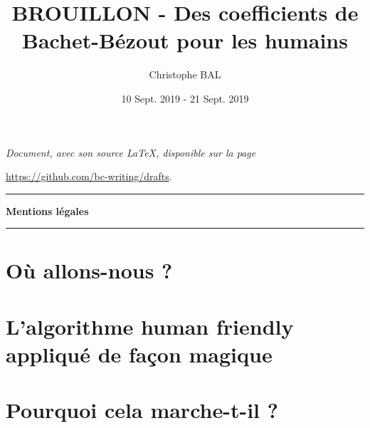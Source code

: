 \documentclass{amsart}
\begin{document}
\title{BROUILLON - Des coefficients de Bachet-Bézout pour les humains}
\author{Christophe BAL}
\date{10 Sept. 2019 - 21 Sept. 2019}

\maketitle

\begin{center}
    \itshape
    Document, avec son source \LaTeX, disponible sur la page
    
    \url{https://github.com/bc-writing/drafts}.
\end{center}


\bigskip


\begin{center}
    \hrule\vspace{.3em}
    {
        \fontsize{1.35em}{1em}\selectfont
        \textbf{Mentions \og légales \fg}
    }
            
    \vspace{0.45em}
    \doclicenseThis
    \hrule
\end{center}


\vspace{4em}


\setcounter{tocdepth}{2}
\tableofcontents




\newpage
\section{Où allons-nous ?}






\newpage
\section{L'algorithme \og human friendly \fg{} appliqué de façon magique}






\newpage
\section{Pourquoi cela marche-t-il ?}




\end{document}
